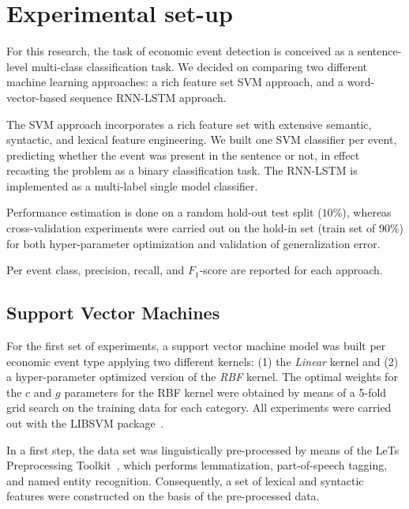 \documentclass[11pt,a4paper]{article}
\begin{document}
\section{Experimental set-up}

For this research, the task of economic event detection is conceived as a sentence-level multi-class classification task. 
We decided on comparing two different machine learning approaches: a rich feature set SVM approach, and a word-vector-based sequence RNN-LSTM approach.

The SVM approach incorporates a rich feature set with extensive semantic, syntactic, and lexical feature engineering.
We built one SVM classifier per event, predicting whether the event was present in the sentence or not, in effect recasting the problem as a binary classification task.
The RNN-LSTM is implemented as a multi-label single model classifier.

Performance estimation is done on a random hold-out test split ($10\%$), whereas cross-validation experiments were carried out on the hold-in set (train set of 90\%) for both hyper-parameter optimization and validation of generalization error.

Per event class, precision, recall, and $F_1$-score are reported for each approach.

\subsection{Support Vector Machines}

For the first set of experiments, a support vector machine model was built per economic event type applying two different kernels: (1) the \emph{Linear} kernel and (2) a hyper-parameter optimized version of the \emph{RBF} kernel. 
The optimal weights for the $c$ and $g$ parameters for the RBF kernel were obtained by means of a 5-fold grid search on the training data for each category.
All experiments were carried out with the LIBSVM package~\cite{Chang2011}.

In a first step, the data set was linguistically pre-processed by means of the LeTs Preprocessing Toolkit~\cite{VandeKauter2013}, which performs lemmatization, part-of-speech tagging, and named entity recognition.
Consequently, a set of lexical and syntactic features were constructed on the basis of the pre-processed data.
\end{document}
